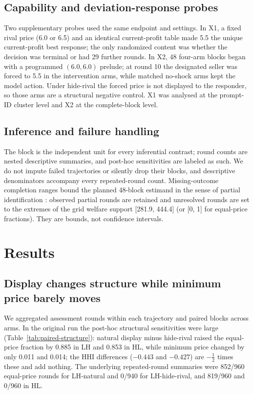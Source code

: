\documentclass[sigconf,review,anonymous]{acmart}
\begin{document}
\subsection{Capability and deviation-response probes}

Two supplementary probes used the same endpoint and settings. In X1, a fixed rival price (6.0 or 6.5) and an identical current-profit table made 5.5 the unique current-profit best response; the only randomized content was whether the decision was terminal or had 29 further rounds. In X2, 48 four-arm blocks began with a programmed $(6.0,6.0)$ prelude; at round 10 the designated seller was forced to 5.5 in the intervention arms, while matched no-shock arms kept the model action. Under hide-rival the forced price is not displayed to the responder, so those arms are a structural negative control. X1 was analysed at the prompt-ID cluster level and X2 at the complete-block level.

\subsection{Inference and failure handling}

The block is the independent unit for every inferential contrast; round counts are nested descriptive summaries, and post-hoc sensitivities are labeled as such. We do not impute failed trajectories or silently drop their blocks, and descriptive denominators accompany every repeated-round count. Missing-outcome completion ranges bound the planned 48-block estimand in the sense of partial identification \cite{manski2003partial}: observed partial rounds are retained and unresolved rounds are set to the extremes of the grid welfare support [281.9, 444.4] (or [0, 1] for equal-price fractions). They are bounds, not confidence intervals.

\section{Results}\label{sec:results}

\subsection{Display changes structure while minimum price barely moves}

We aggregated assessment rounds within each trajectory and paired blocks across arms. In the original run the post-hoc structural sensitivities were large (Table~\ref{tab:paired-structure}): natural display minus hide-rival raised the equal-price fraction by 0.885 in LH and 0.853 in HL, while minimum price changed by only 0.011 and 0.014; the HHI differences ($-0.443$ and $-0.427$) are $-\tfrac{1}{2}$ times these and add nothing. The underlying repeated-round summaries were 852/960 equal-price rounds for LH-natural and 0/940 for LH-hide-rival, and 819/960 and 0/960 in HL.
\end{document}
